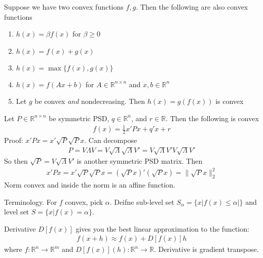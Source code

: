 \documentclass[12pt]{article}
\numberwithin{equation}{section} %
\theoremstyle{plain}
\theoremstyle{definition}
\theoremstyle{remark}
\newcommand{\ra}{\rightarrow}
\newcommand{\R}{\mathbb{R}}
\newcommand{\Rn}{\mathbb{R}^n}
\newcommand{\Rnn}{\mathbb{R}^{n\times n}}
\begin{document}
Suppose we have two convex functions $f,g$.
Then the following are also convex functions
\begin{enumerate}
  \item $h(x)=\beta f(x)$ for $\beta \geq 0$
  \item $h(x)=f(x)+g(x)$
  \item $h(x)=\max\{f(x),g(x)\}$
  \item $h(x)=f(Ax+b)$ for $A\in \Rnn$ and $x,b\in\Rn$
  \item Let $g$ be convex \emph{and} nondecreasing. Then $h(x)=g(f(x))$
    is convex
\end{enumerate}
Let $P\in\Rnn$ be symmetric PSD, $q\in\Rn$, and $r\in\R$.
Then the following is convex
\begin{align*}
  f(x)=\frac{1}{2}x'Px+q'x+r
\end{align*}
Proof: $x'Px=x'\sqrt{P}\sqrt{P}x$.
Can decompose
\begin{align*}
  P=V\Lambda V
  = V\sqrt{\Lambda}\sqrt{\Lambda}V'
  = V\sqrt{\Lambda}V'V\sqrt{\Lambda}V'
\end{align*}
So then $\sqrt{P}=V\sqrt{\Lambda}V'$ is another symmetric PSD matrix.
Then
\begin{align*}
  x'Px
  =x'\sqrt{P}\sqrt{P}x
  =(\sqrt{P}x)'(\sqrt{P}x)
  =\lVert \sqrt{P}x\rVert^2_2
\end{align*}
Norm convex and inside the norm is an affine function.

Terminology.
For $f$ convex, pick $\alpha$.
Deifne sub-level set $S_\alpha=\{x|f(x)\leq\alpha|\}$
and level set $S=\{x|f(x)=\alpha\}$.


Derivative $D[f(x)]$ gives you the best linear approximation to the
function:
\begin{align*}
  f(x+h) \approx f(x) + D[f(x)]h
\end{align*}
where $f:\Rn\ra\R^m$ and $D[f(x)](h):\Rn\ra\R$.
Derivative is gradient transpose.



\clearpage
\end{document}

